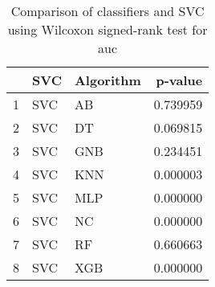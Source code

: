 \begin{table}
\footnotesize
\caption{Comparison of classifiers and SVC using Wilcoxon signed-rank test for auc}
\label{tab:SVC wilcoxon AUC comparison}
\begin{tabular}{lllr}
\hline
 & SVC & Algorithm & p-value \\
\hline
1 & SVC & AB & 0.739959 \\
2 & SVC & DT & 0.069815 \\
3 & SVC & GNB & 0.234451 \\
4 & SVC & KNN & 0.000003 \\
5 & SVC & MLP & 0.000000 \\
6 & SVC & NC & 0.000000 \\
7 & SVC & RF & 0.660663 \\
8 & SVC & XGB & 0.000000 \\
\hline
\end{tabular}
\end{table}
